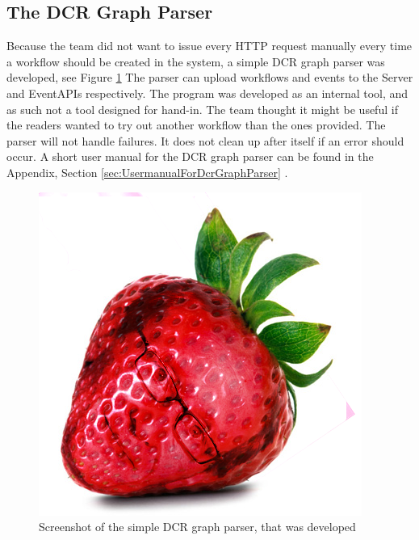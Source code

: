 \subsection{The DCR Graph Parser}
Because the team did not want to issue every HTTP request manually every time a workflow should be created in the system, a simple DCR graph parser was developed, see Figure \ref{fig:DcrGraphParserScreenShot} The parser can upload workflows and events to the Server and EventAPIs respectively. The program was developed as an internal tool, and as such not a tool designed for hand-in. The team thought it might be useful if the readers wanted to try out another workflow than the ones provided. \newline
The parser will not handle failures. It does not clean up after itself if an error should occur.
A short user manual for the DCR graph parser can be found in the Appendix, Section \ref{sec:UsermanualForDcrGraphParser} . 

\begin{figure}
\centering
\includegraphics[width=0.4\linewidth]{Figures/strawberry}
\caption{\label{fig:DcrGraphParserScreenShot} Screenshot of the simple DCR graph parser, that was developed}
\end{figure}